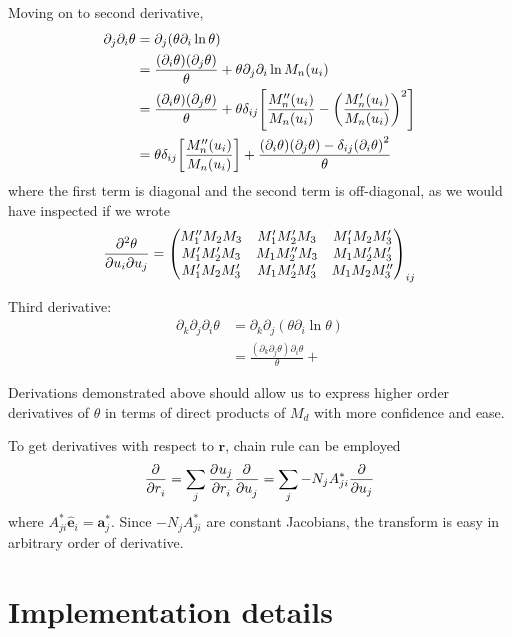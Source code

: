 \documentclass[12pt]{extarticle}
\renewcommand{\bf}{\mathbf}
\begin{document}
    Moving on to second derivative, \begin{align*}
        \partial_j \partial_i \theta &= \partial_j \pqty{\theta \partial_i \ln \theta}\\
        &= \frac{\pqty{\partial_i \theta} \pqty{\partial_j \theta}}{\theta} + \theta \partial_j \partial_i \ln M_n (u_i)\\
        &= \frac{\pqty{\partial_i \theta} \pqty{\partial_j \theta}}{\theta} + \theta \delta_{ij} \bqty{\frac{M''_n (u_i)}{M_n(u_i)} - \pqty{\frac{M'_n(u_i)}{M_n(u_i)} }^2}\\
        &= \theta \delta_{ij} \bqty{\frac{M''_n (u_i)}{M_n(u_i)} } + \frac{\pqty{\partial_i \theta} \pqty{\partial_j \theta} - \delta_{ij} \pqty{\partial_i \theta}^2 }{\theta} 
    \end{align*}
    where the first term is diagonal and the second term is off-diagonal, as we would have inspected if we wrote \[
        \pdv{\theta}{u_i}{u_j} = \begin{pmatrix} 
            M''_1 M_2 M_3 & M'_1 M'_2 M_3 & M'_1 M_2 M'_3\\
            M'_1 M'_2 M_3 & M_1 M''_2 M_3 & M_1 M'_2 M'_3\\
            M'_1 M_2 M'_3 & M_1 M'_2 M'_3 & M_1 M_2 M''_3
        \end{pmatrix}_{ij}
    \]

    Third derivative:
    \begin{align*}
        \partial_k \partial_j \partial_i \theta 
        &= \partial_k \partial_j (\theta \partial_i \ln \theta)\\
        &= \frac{(\partial_k \partial_j \theta) \partial_i \theta}{\theta} +  
    \end{align*}
    
    Derivations demonstrated above should allow us to express higher order derivatives of \(\theta\) in terms of direct products of \(M_d\) with more confidence and ease.

    To get derivatives with respect to \(\bf r\), chain rule can be employed \[
        \pdv[]{}{r_i} = \sum_j \pdv[]{u_j}{r_i} \pdv[]{}{u_j} = \sum_j - N_j A^*_{ji} \pdv{u_j}
    \]
    where \(A^*_{ji} \hat{\bf e}_i = \bf a^*_j\). Since \( - N_j A^*_{ji}\) are constant Jacobians, the transform is easy in arbitrary order of derivative.

\section{Implementation details}
\end{document}
